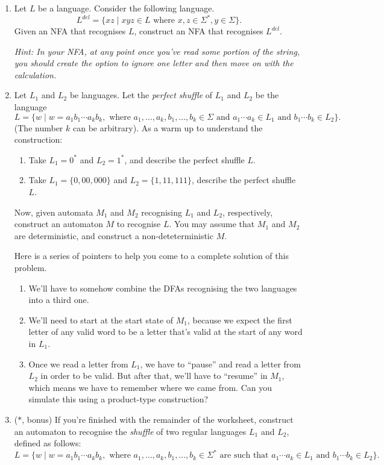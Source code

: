 \documentclass{amsart}
\begin{document}
\begin{enumerate}
\item Let \(L\) be a language. Consider the following language.
\[L^{del} = \{xz \mid xyz \in L\text{ where }x,z\in \Sigma^*, y \in \Sigma\}.\]
Given an NFA that recognises \(L\), construct an NFA that recognises \(L^{del}\).

\emph{Hint: In your NFA, at any point once you've read some portion of the string, you should create the option to ignore one letter and then move on with the calculation.}

\item Let \(L_1\)  and \(L_2\) be languages. Let the \emph{perfect shuffle} of \(L_1\) and \(L_2\) be the language
\[L = \{w \mid w = a_1 b_1 \cdots a_k b_k, \text{ where } a_1, \dots, a_k, b_1, \dots, b_k \in \Sigma \text{ and } a_1 \cdots a_k \in L_1 \text{ and } b_1 \cdots b_k \in L_2\}.\]
(The number \(k\) can be arbitrary).
As a warm up to understand the construction:
\begin{enumerate}
\item Take \(L_1 = 0^{*}\) and \(L_2 = 1^{*}\), and describe the perfect shuffle \(L\).
\item Take \(L_1 = \{0,00,000\}\) and \(L_2= \{1,11,111\}\), describe the perfect shuffle \(L\).
\end{enumerate}

Now, given automata \(M_1\) and \(M_2\) recognising \(L_1\) and \(L_2\), respectively, construct an automaton \(M\) to recognise \(L\).
You may assume that \(M_1\) and \(M_2\) are deterministic, and construct a non-deteterministic \(M\).

Here is a series of pointers to help you come to a complete solution of this problem.
\begin{enumerate}
\item We'll have to somehow combine the DFAs recognising the two languages into a third one.

\item We'll need to start at the start state of \(M_1\), because we expect the first letter of any valid word to be a letter that's valid at the start of any word in \(L_1\).

\item Once we read a letter from \(L_1\), we have to ``pause'' and read a letter from \(L_2\) in order to be valid. But after that, we'll have to ``resume'' in \(M_1\), which means we have to remember where we came from. Can you simulate this using a product-type construction?
\end{enumerate}
\item (\(\ast\), bonus) If you're finished with the remainder of the worksheet, construct an automaton to recognise the \emph{shuffle} of two regular languages \(L_1\) and \(L_2\), defined as follows:
\[L = \{w \mid w = a_1 b_1 \cdots a_k b_k, \text{ where } a_1, \dots, a_k, b_1, \dots, b_k \in \Sigma^{*} \text{ are such that } a_1 \cdots a_k \in L_1 \text{ and } b_1 \cdots b_k \in L_2\}.\]
\end{enumerate}
\end{document}

